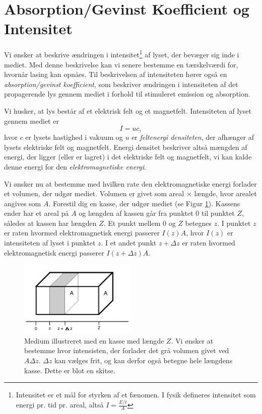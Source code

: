 \section{Absorption/Gevinst Koefficient og Intensitet}
Vi ønsker at beskrive ændringen i intensitet\footnote{Intensitet er et mål for styrken af et fænomen. I fysik defineres intensitet som energi pr. tid pr. areal, altså $I = \frac{E/t}{A}$} af lyset, der bevæger sig inde i mediet. Med denne beskrivelse kan vi senere bestemme en tærskelværdi for, hvornår lasing kan opnåes. Til beskrivelsen af intensiteten hører også en \emph{absorption/gevinst koefficient}, som beskriver ændringen i intensiteten af det propagerende lys gennem mediet i forhold til stimuleret emission og absorption. 

Vi husker, at lys består af et elektrisk felt og et magnetfelt. Intensiteten af lyset gennem mediet er 
\begin{equation}
I = uc,
\label{eq:intensitet}
\end{equation}
hvor $c$ er lysets hastighed i vakuum og $u$ er \emph{feltenergi densiteten}, der afhænger af lysets elektriske felt og magnetfelt. Energi densitet beskriver altså mængden af energi, der ligger (eller er lagret) i det elektriske felt og magnetfelt, vi kan kalde denne energi for den \emph{elektromagnetiske energi}. 

Vi ønsker nu at bestemme med hvilken rate den elektromagnetiske energi forlader et volumen, der udgør mediet. Volumen er givet som areal $\times$ længde, hvor arealet angives som $A$. Forestil dig en kasse, der udgør mediet (se Figur \ref{fig:intenmed}). Kassens ender har et areal på $A$ og længden af kassen går fra punktet 0 til punktet $Z$, således at kassen har længden $Z$. Et punkt mellem 0 og $Z$ betegnes $z$. I punktet $z$ er raten hvormed elektromagnetisk energi passerer $I(z)A$, hvor $I(z)$ er intensiteten af lyset i punktet $z$. I et andet punkt $z+\Delta z$ er raten hvormed elektromagnetisk energi passerer $I(z+\Delta z)A$. 

\begin{figure}[h!]
  \centering
  \includegraphics[width=0.5\textwidth]{Laserfysik/intensitetmedium.png}
  \caption{Medium illustreret med en kasse med længde $Z$. Vi ønsker at bestemme hvor intensisten, der forlader det grå volumen givet ved $A\Delta z$. $\Delta z$ kan vælges frit, og kan derfor også betegne hele længdens kasse. Dette er blot en skitse.}
  \label{fig:intenmed}
\end{figure}

